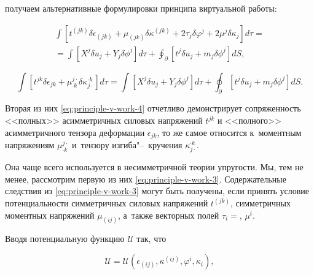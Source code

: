 получаем альтернативные формулировки принципа виртуальной работы:

\begin{multline}

\int\left[{t^{(jk)}\delta\epsilon_{(jk)}+\mu_{(jk)}\delta\kappa^{(jk)}+2\tau_j\delta\varphi^j+2\mu^j\delta\kappa_j}\right]d\tau=\\

%

=\int\left[{X^j\delta u_j+Y_j\delta\phi^j}\right]d\tau+\oint _\partial\left[{t^j\delta u_j+m_j\delta\phi^j}\right]dS,

\label{eq:principle-v-work-3}

\end{multline}







\begin{equation}

\int\left[{t^{jk}\delta\epsilon_{jk}+\mu^{j\cdot}_{\cdot k}\delta\kappa_{j\cdot}^{\cdot k}}\right]d\tau=\int\left[{X^j\delta u_j+Y_j\delta\phi^j}\right]d\tau+\oint _\partial\left[{t^j\delta u_j+m_j\delta\phi^j}\right]dS.

\label{eq:principle-v-work-4}

\end{equation}



\newpage 



Вторая из них \eqref{eq:principle-v-work-4} отчетливо демонстрирует сопряженность <<полных>> асимметричных силовых напряжений \(t^{jk}\) и <<полного>> асимметричного тензора деформации \(\epsilon_{jk}\), то же самое относится к~моментным напряжениям \(\mu^{j\cdot}_{\cdot k}\) и~тензору изгиба"--~кручения \(\kappa_{j\cdot}^{\cdot k}\). 

Она чаще всего используется в несимметричной теории упругости. Мы, тем не менее, рассмотрим первую из них \eqref{eq:principle-v-work-3}. Содержательные следствия из \eqref{eq:principle-v-work-3} могут быть получены, если принять условие потенциальности симметричных силовых напряжений \(t^{(jk)}\), симметричных моментных напряжений \(\mu_{(ij)}\), а~также векторных полей \(\tau_i=\), \(\mu^i\). 

Вводя потенциальную функцию \({\mathscr U}\) так, что

\begin{equation}

{\mathscr U}={\mathscr U}(\epsilon_{(ij)},\kappa^{(ij)},\varphi^i,\kappa_i),

\end{equation}

